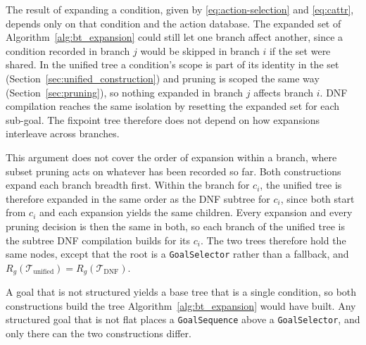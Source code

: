     \label{subsec:order_independence}
    The result of expanding a condition, given by \eqref{eq:action-selection} and \eqref{eq:cattr}, depends only on that condition and the action database.
    The expanded set of Algorithm~\ref{alg:bt_expansion} could still let one branch affect another, since a condition recorded in branch $j$ would be skipped in branch $i$ if the set were shared.
    In the unified tree a condition's scope is part of its identity in the set (Section~\ref{sec:unified_construction}) and pruning is scoped the same way (Section~\ref{sec:pruning}), so nothing expanded in branch $j$ affects branch $i$.
    DNF compilation reaches the same isolation by resetting the expanded set for each sub-goal.
    The fixpoint tree therefore does not depend on how expansions interleave across branches.

    This argument does not cover the order of expansion within a branch, where subset pruning acts on whatever has been recorded so far.
    Both constructions expand each branch breadth first.
    Within the branch for $c_i$, the unified tree is therefore expanded in the same order as the DNF subtree for $c_i$, since both start from $c_i$ and each expansion yields the same children.
    Every expansion and every pruning decision is then the same in both, so each branch of the unified tree is the subtree DNF compilation builds for its $c_i$.
    The two trees therefore hold the same nodes, except that the root is a \texttt{GoalSelector} rather than a fallback, and $R_g(\mathcal{T}_{\text{unified}}) = R_g(\mathcal{T}_{\text{DNF}})$.

    A goal that is not structured yields a base tree that is a single condition, so both constructions build the tree Algorithm~\ref{alg:bt_expansion} would have built.
    Any structured goal that is not flat places a \texttt{GoalSequence} above a \texttt{GoalSelector}, and only there can the two constructions differ.
    
